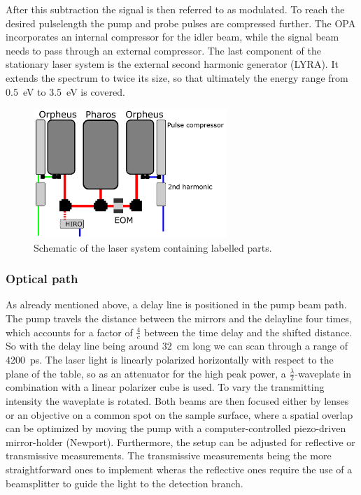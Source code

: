 After this subtraction the signal is then referred to as modulated.
To reach the desired pulselength the pump and probe pulses are compressed further.
The OPA incorporates an internal compressor for the idler beam, while the signal beam needs to pass through an external compressor.
The last component of the stationary laser system is the external second harmonic generator (LYRA).
It extends the spectrum to twice its size, so that ultimately the energy range from \qty{0.5}{eV} to \qty{3.5}{eV} is covered. 
\begin{figure}[ht]
    \centering
    \includegraphics[width=0.65\textwidth]{pictures/laser_system.png}
    \caption{Schematic of the laser system containing labelled parts.}
    \label{fig:laser_systems}
\end{figure}

\subsubsection*{Optical path}
As already mentioned above, a delay line is positioned in the pump beam path.
The pump travels the distance between the mirrors and the delayline four times, which accounts for a factor of $\frac{4}{c}$ between the time delay and the shifted distance.
So with the delay line being around \qty{32}{cm} long we can scan through a range of \qty{4200}{ps}.
The laser light is linearly polarized horizontally with respect to the plane of the table, so as an attenuator for the high peak power, a $\frac{\lambda}{2}$-waveplate in combination with a linear polarizer cube is used.
To vary the transmitting intensity the waveplate is rotated.
Both beams are then focused either by lenses or an objective on a common spot on the sample surface, where a spatial overlap can be optimized by moving the pump with a computer-controlled piezo-driven mirror-holder (Newport).
Furthermore, the setup can be adjusted for reflective or transmissive measurements.
The transmissive measurements being the more straightforward ones to implement wheras the reflective ones require the use of a beamsplitter to guide the light to the detection branch.

